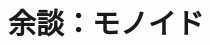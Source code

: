 \documentclass[a5paper,twoside,fleqn,draft]{jsbook}
\newcommand{\mSpecialFunc}[1]{\mathrm{#1}}
\DeclareMathOperator{\mPred}{\mSpecialFunc{pred}}
\DeclareMathOperator{\mSucc}{\mSpecialFunc{succ}}
\newcommand{\mType}[1]{\mathbf{#1}}
\newcommand{\mBoolType}{\mType{Bool}}
\newcommand{\mCharType}{\mType{Char}}
\newcommand{\mFloatType}{\mType{Float}}
\newcommand{\mDoubleType}{\mType{Double}}
\newcommand{\mIntType}{\mType{Int}}
\newcommand{\mIntegerType}{\mType{Integer}}
\newcommand{\mGenericTypeClass}[1]{\textsc{#1}} %
\newcommand{\mEnumTypeClass}{\mGenericTypeClass{Enum}}
\newcommand{\mEqTypeClass}{\mGenericTypeClass{Eq}}
\newcommand{\mIntegralTypeClass}{\mGenericTypeClass{Integral}}
\newcommand{\mNumTypeClass}{\mGenericTypeClass{Num}}
\newcommand{\mOrdTypeClass}{\mGenericTypeClass{Ord}}
\newcommand{\mRealTypeClass}{\mGenericTypeClass{Real}}
\begin{document}

\section{余談：モノイド}
\end{document}
